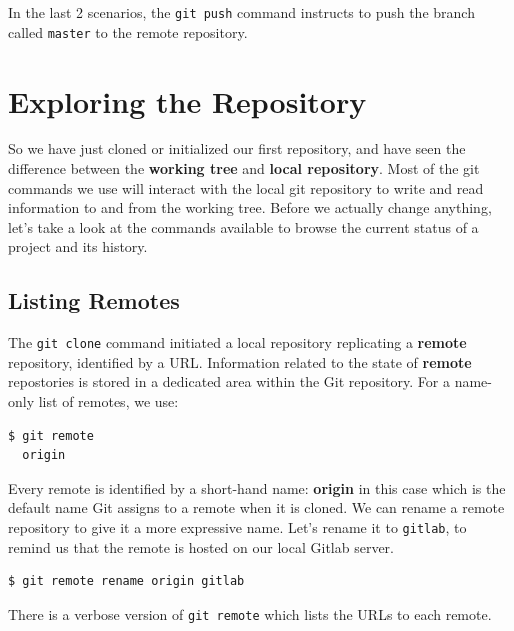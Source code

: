 \documentclass{../../common/tufte-latex/tufte-handout}
\begin{document}
In  the last 2 scenarios, the \texttt{git push} command instructs to push the branch called \texttt{master} to the remote repository. 

\section{Exploring the Repository}

So we have just cloned or initialized our first repository, and have seen the difference between the \textbf{working tree} and \textbf{local repository}.
Most of the git commands we use will interact with the local git repository to write and read information to and from the working tree.
Before we actually change anything, let's take a look at the commands available to browse the current status of a project and its history.

\subsection{Listing Remotes}

The \texttt{git clone} command initiated a local repository replicating a \textbf{remote} repository, identified by a URL.
Information related to the state of \textbf{remote} repostories is stored in a dedicated area within the Git repository.
For a name-only list of remotes, we use:

\begin{lstlisting}[style=BashInputStyle]
  $ git remote
  origin
\end{lstlisting}

Every remote is identified by a short-hand name: \textbf{origin} in this case which is the default name Git assigns to a remote when it is cloned.
We can rename a remote repository to give it a more expressive name.
Let's rename it to \texttt{gitlab}, to remind us that the remote is hosted on our local Gitlab server.

\begin{lstlisting}[style=BashInputStyle]
  $ git remote rename origin gitlab
\end{lstlisting}


There is a verbose version of \texttt{git remote} which lists the URLs to each remote.
\end{document}
